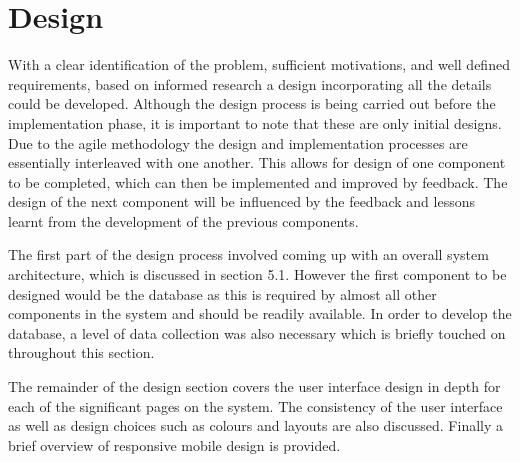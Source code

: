 \chapter{Design}
\label{Chapter:Design}
With a clear identification of the problem, sufficient motivations, and well defined requirements, based on informed research a design incorporating all the details could be developed. Although the design process is being carried out before the implementation phase, it is important to note that these are only initial designs. Due to the agile methodology the design and implementation processes are essentially interleaved with one another. This allows for design of one component to be completed, which can then be implemented and improved by feedback. The design of the next component will be influenced by the feedback and lessons learnt from the development of the previous components.

The first part of the design process involved coming up with an overall system architecture, which is discussed in section 5.1. However the first component to be designed would be the database as this is required by almost all other components in the system and should be readily available. In order to develop the database, a level of data collection was also necessary which is briefly touched on throughout this section.

The remainder of the design section covers the user interface design in depth for each of the significant pages on the system. The consistency of the user interface as well as design choices such as colours and layouts are also discussed. Finally a brief overview of responsive mobile design is provided.







